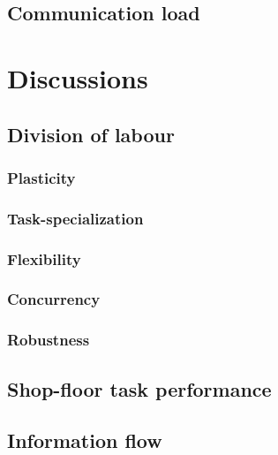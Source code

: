 \subsection*{Communication load}


\section{Discussions}
\label{afm:discuss}
\subsection*{Division of labour}
\subsubsection*{Plasticity}

\subsubsection*{Task-specialization}

\subsubsection*{Flexibility}

\subsubsection*{Concurrency}

\subsubsection*{Robustness}

\subsection*{Shop-floor task performance}

\subsection*{Information flow}

